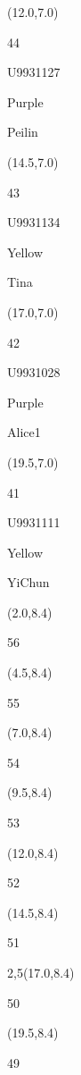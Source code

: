 \documentclass[a4paper]{article}
\newcommand{\myseat}[4]{%
\vspace{-0.1cm} \hspace{-0.5cm}
\parbox[t][2.2cm][t]{3.5cm}{%
\small #1 %
\begin{description}
\vspace{-0.1cm}
\item [ID:] #2
\vspace{-0.1cm}
\item [Team:] #3 \normalsize
\vspace{-0.1cm}
\item \normalsize #4
\vspace{-0.1cm}
\end{description}
}
}
\begin{document}
\begin{textblock}{2.5}(12.0,7.0)
\myseat{44}{U9931127}{Purple}{Peilin}
\end{textblock}

\begin{textblock}{2.5}(14.5,7.0)
\myseat{43}{U9931134}{Yellow}{Tina}
\end{textblock}

\begin{textblock}{2.5}(17.0,7.0)
\myseat{42}{U9931028}{Purple}{Alice1}
\end{textblock}

\begin{textblock}{2.5}(19.5,7.0)
\myseat{41}{U9931111}{Yellow}{YiChun}
\end{textblock}


\begin{textblock}{2.5}(2.0,8.4)
\textblockcolor{}
\myseat{56}{}{}{}
\end{textblock}

\begin{textblock}{2.5}(4.5,8.4)
\textblockcolor{}
\myseat{55}{}{}{}
\end{textblock}

\begin{textblock}{2.5}(7.0,8.4)
\textblockcolor{}
\myseat{54}{}{}{}
\end{textblock}

\begin{textblock}{2.5}(9.5,8.4)
\textblockcolor{}
\myseat{53}{}{}{}
\end{textblock}

\begin{textblock}{2.5}(12.0,8.4)
\textblockcolor{}
\myseat{52}{}{}{}
\end{textblock}

\begin{textblock}{2.5}(14.5,8.4)
\textblockcolor{}
\myseat{51}{}{}{}
\end{textblock}

\begin{textblock}{2,5}(17.0,8.4)
\textblockcolor{}
\myseat{50}{}{}{}
\end{textblock}

\begin{textblock}{2.5}(19.5,8.4)
\textblockcolor{}
\myseat{49}{}{}{}
\end{textblock}
\end{document}

